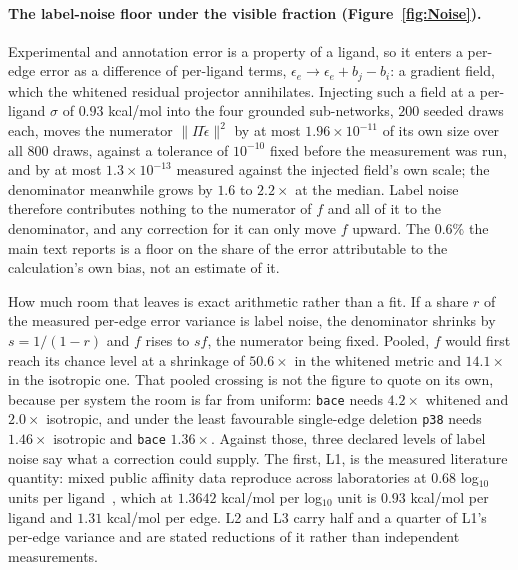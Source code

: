 \paragraph{The label-noise floor under the visible fraction (Figure~\ref{fig:Noise}).} Experimental
and annotation error is a property of a ligand, so it enters a per-edge error as a difference of
per-ligand terms, $\epsilon_e\to\epsilon_e+b_j-b_i$: a gradient field, which the whitened residual
projector annihilates. Injecting such a field at a per-ligand $\sigma$ of $0.93$ kcal/mol into the
four grounded sub-networks, $200$ seeded draws each, moves the numerator $\|\Pi\tilde\epsilon\|^2$
by at most $1.96\times10^{-11}$ of its own size over all $800$ draws, against a tolerance of
$10^{-10}$ fixed before the measurement was run, and by at most $1.3\times10^{-13}$ measured
against the injected field's own scale; the denominator meanwhile grows by $1.6$ to $2.2\times$ at
the median. Label noise therefore contributes nothing to the numerator of $f$ and all of it to the
denominator, and any correction for it can only move $f$ upward. The $0.6\%$ the main text reports
is a floor on the share of the error attributable to the calculation's own bias, not an estimate of
it.

How much room that leaves is exact arithmetic rather than a fit. If a share $r$ of the measured
per-edge error variance is label noise, the denominator shrinks by $s=1/(1-r)$ and $f$ rises to
$sf$, the numerator being fixed. Pooled, $f$ would first reach its chance level at a shrinkage of
$50.6\times$ in the whitened metric and $14.1\times$ in the isotropic one. That pooled crossing is
not the figure to quote on its own, because per system the room is far from uniform:
\texttt{bace} needs $4.2\times$ whitened and $2.0\times$ isotropic, and under the least
favourable single-edge deletion \texttt{p38} needs $1.46\times$ isotropic and \texttt{bace}
$1.36\times$. Against those, three declared levels of label noise say what a correction could
supply. The first, L1, is the measured literature quantity: mixed public affinity data reproduce
across laboratories at $0.68$ log$_{10}$ units per ligand~\citep{kalliokoski2013mixedic50}, which
at $1.3642$ kcal/mol per log$_{10}$ unit is $0.93$ kcal/mol per ligand and $1.31$ kcal/mol per
edge. L2 and L3 carry half and a quarter of L1's per-edge variance and are stated reductions of it
rather than independent measurements.


